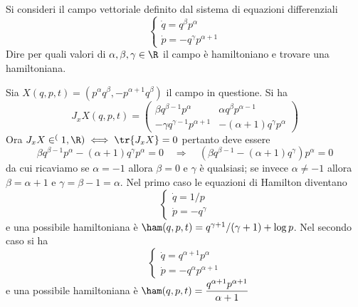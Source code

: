 \begin{exercise}
    Si consideri il campo vettoriale definito dal sistema di equazioni differenziali
    \[
        \begin{cases}
            \dot{q} = q^{\beta} p^\alpha \\
            \dot{p} = - q^{\gamma} p^{\alpha+1}
        \end{cases}
    \]
    Dire per quali valori di $ \alpha, \beta, \gamma \in \R $ il campo è hamiltoniano e trovare una hamiltoniana.
\end{exercise}
\begin{solution}
    Sia $ X(q, p, t) = (p^\alpha q^\beta, -p^{\alpha+1}q^{\beta}) $ il campo in questione. Si ha
    \[
        J_x X (q, p, t) =
        \begin{pmatrix}
            \beta q^{\beta-1} p^{\alpha} & \alpha q^{\beta} p^{\alpha-1} \\
            - \gamma q^{\gamma-1} p^{\alpha+1} & - (\alpha+1) q^{\gamma} p^{\alpha}
        \end{pmatrix}
    \]
    Ora $ J_x X \in \sp(1, \R) \iff \tr{J_x X} = 0 $ pertanto deve essere
    \[
        \beta q^{\beta-1} p^{\alpha} - (\alpha+1) q^{\gamma} p^{\alpha} = 0 \quad \Rightarrow \quad \left(\beta q^{\beta-1} - (\alpha+1) q^{\gamma}\right) p^{\alpha} = 0
    \]
    da cui ricaviamo se $ \alpha = -1 $ allora $ \beta = 0 $ e $ \gamma $ è qualsiasi; se invece $ \alpha \neq -1 $ allora $ \beta = \alpha+1 $ e $ \gamma = \beta - 1 = \alpha $. Nel primo caso le equazioni di Hamilton diventano
    \[
        \begin{cases}
            \dot{q} = 1/p \\
            \dot{p} = -q^{\gamma}
        \end{cases}
    \]
    e una possibile hamiltoniana è $ \ham (q, p, t) = q^{\gamma+1}/(\gamma+1) + \log{p} $. Nel secondo caso si ha
    \[
        \begin{cases}
            \dot{q} = q^{\alpha+1} p^\alpha  \\
            \dot{p} = - q^{\alpha} p^{\alpha+1}
        \end{cases}
    \]
    e una possibile hamiltoniana è $ \ham(q, p, t) = \dfrac{q^{\alpha+1}p^{\alpha+1}}{\alpha+1} $
\end{solution}

